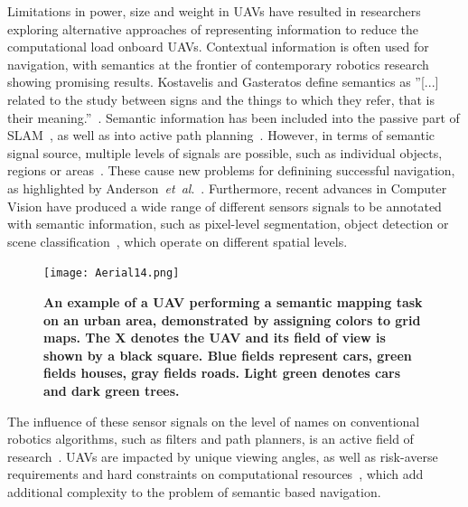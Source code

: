 \documentclass[twocolumn,letterpaper]{IEEEAerospaceCLS}  %
\newcommand{\abbreviation}[1]{\emph{#1}.}
\newcommand{\etal}{\abbreviation{et~al}}
\begin{document}
Limitations in power, size and weight in UAVs have resulted in researchers exploring alternative approaches of representing information to reduce the computational load onboard UAVs. Contextual information is often used for navigation, with semantics at the frontier of contemporary robotics research showing promising results. Kostavelis and Gasteratos define semantics as ''[...] related to the study between signs and the things to which they refer, that is their meaning.''~\cite{kostavelis_semantic_2015}. Semantic information has been included into the passive part of SLAM~\cite{cadena_past_2016,zhang_hierarchical_2019}, as well as into active path planning~\cite{koch_automatic_2019,alirezaie_exploiting_2017}.  However, in terms of semantic signal source, multiple levels of signals are possible, such as individual objects, regions or areas~\cite{kostavelis_semantic_2015}. These cause new problems for definining successful navigation, as highlighted by Anderson~\etal~\cite{anderson_evaluation_2018}. Furthermore, recent advances in Computer Vision have produced a wide range of different sensors signals to be annotated with semantic information, such as pixel-level segmentation, object detection or scene classification~\cite{alom_history_2018}, which operate on different spatial levels.
\begin{figure}[t]
    \centering
    \texttt{[image: Aerial14.png]}\\
    \caption{\bf{An example of a UAV performing a semantic mapping task on an urban area, demonstrated by assigning colors to grid maps. The X denotes the UAV and its field of view is shown by a black square. Blue fields represent cars, green fields houses, gray fields roads. Light green denotes cars and dark green trees.}}
    \label{fig:AerialImg}
\end{figure}
The influence of these sensor signals on the level of names on conventional robotics algorithms, such as filters and path planners, is an active field of research~\cite{kostavelis_semantic_2015,cadena_past_2016,anderson_evaluation_2018}. UAVs are impacted by unique viewing angles, as well as risk-averse requirements and hard constraints on computational resources~\cite{mandel_method_2020,gonzalez_unmanned_2016,boroujerdian_mavbench_2018}, which add additional complexity to the problem of semantic based navigation.
\end{document}
